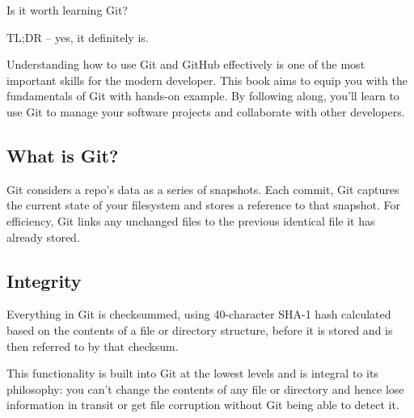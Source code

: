 \noindent Is it worth learning Git? \newline

\noindent TL;DR – yes, it definitely is. \newline

Understanding how to use Git and GitHub effectively is one of the most important skills for the modern developer. This book aims to equip you with the fundamentals of Git with hands-on example. By following along, you'll learn to use Git to manage your software projects and collaborate with other developers.



\subsection{What is Git?}

Git considers a repo’s data as a series of snapshots. Each commit, Git captures the current state of your filesystem and stores a reference to that snapshot. For efficiency, Git links any unchanged files to the previous identical file it has already stored.



\subsection{Integrity}

Everything in Git is checksummed, using 40-character SHA-1 hash calculated based on the contents of a file or directory structure, before it is stored and is then referred to by that checksum.

\begin{center}
\end{center}

This functionality is built into Git at the lowest levels and is integral to its philosophy: you can’t change the contents of any file or directory and hence lose information in transit or get file corruption without Git being able to detect it.

